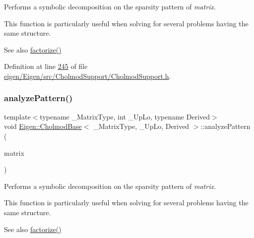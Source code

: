 Performs a symbolic decomposition on the sparsity pattern of {\itshape matrix}.

This function is particularly useful when solving for several problems having the same structure.

\begin{DoxySeeAlso}{See also}
\hyperlink{class_eigen_1_1_cholmod_base_a5bd9c9ec4d1c15f202a6c66b5e9ef37b}{factorize()} 
\end{DoxySeeAlso}


Definition at line \hyperlink{eigen_2_eigen_2src_2_cholmod_support_2_cholmod_support_8h_source_l00245}{245} of file \hyperlink{eigen_2_eigen_2src_2_cholmod_support_2_cholmod_support_8h_source}{eigen/\+Eigen/src/\+Cholmod\+Support/\+Cholmod\+Support.\+h}.

\mbox{\label{class_eigen_1_1_cholmod_base_a5ac967e9f4ccfc43ca9e610b89232c24}} 
\subsubsection{\texorpdfstring{analyze\+Pattern()}{analyzePattern()}\hspace{0.1cm}{\footnotesize\ttfamily [2/2]}}
{\footnotesize\ttfamily template$<$typename \+\_\+\+Matrix\+Type, int \+\_\+\+Up\+Lo, typename Derived$>$ \\
void \hyperlink{class_eigen_1_1_cholmod_base}{Eigen\+::\+Cholmod\+Base}$<$ \+\_\+\+Matrix\+Type, \+\_\+\+Up\+Lo, Derived $>$\+::analyze\+Pattern (\begin{DoxyParamCaption}\item[{const Matrix\+Type \&}]{matrix }\end{DoxyParamCaption})\hspace{0.3cm}{\ttfamily [inline]}}

Performs a symbolic decomposition on the sparsity pattern of {\itshape matrix}.

This function is particularly useful when solving for several problems having the same structure.

\begin{DoxySeeAlso}{See also}
\hyperlink{class_eigen_1_1_cholmod_base_a5bd9c9ec4d1c15f202a6c66b5e9ef37b}{factorize()} 
\end{DoxySeeAlso}


